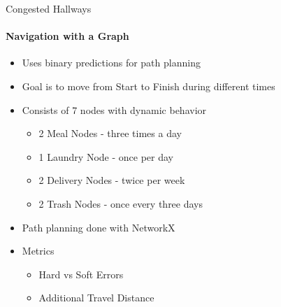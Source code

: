 \documentclass{beamer}
\begin{document}
\begin{frame}[t]{Congested Hallways}
  \framesubtitle{Navigation with a Graph}
  \begin{itemize}
    \setlength\itemsep{.5em}
    \item Uses binary predictions for path planning
    \item Goal is to move from Start to Finish during different times
    \item Consists of 7 nodes with dynamic behavior
    \begin{itemize}
      \item 2 Meal Nodes - three times a day
      \item 1 Laundry Node - once per day
      \item 2 Delivery Nodes - twice per week
      \item 2 Trash Nodes - once every three days
    \end{itemize}
  \item Path planning done with NetworkX
  \item Metrics
  \begin{itemize}
    \item Hard vs Soft Errors
    \item Additional Travel Distance
  \end{itemize}

  \end{itemize}
\end{frame}
\end{document}
